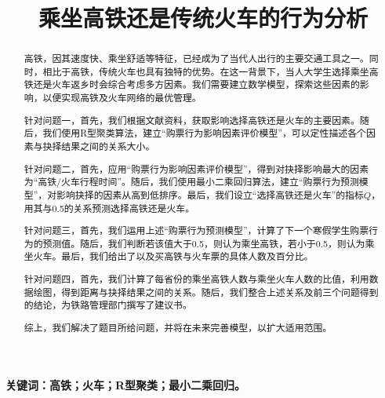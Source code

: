 \documentclass{ctexart}
\begin{document}

\title{\textbf{乘坐高铁还是传统火车的行为分析}}
\author{}
\date{}
\maketitle

\pagestyle{fancy}
\renewcommand{\headrulewidth}{0pt}
\lhead{\small{\leftmark}}
\chead{\small{\rightmark}}
\lfoot{}
\cfoot{}
\rfoot{}

\renewcommand{\abstractname}{\Large 摘要}
\begin{abstract}
	高铁，因其速度快、乘坐舒适等特征，已经成为了当代人出行的主要交通工具之一。同时，相比于高铁，传统火车也具有独特的优势。在这一背景下，当人大学生选择乘坐高铁还是火车返乡时会综合考虑多方因素。我们需要建立数学模型，探索这些因素的影响，以便实现高铁及火车网络的最优管理。

	针对问题一，首先，我们根据文献资料，获取影响选择高铁还是火车的主要因素。随后，我们使用R型聚类算法，建立\enquote{购票行为影响因素评价模型}，可以定性描述各个因素与抉择结果之间的关系大小。

	针对问题二，首先，应用\enquote{购票行为影响因素评价模型}，得到对抉择影响最大的因素为\enquote{高铁/火车行程时间}。随后，我们使用最小二乘回归算法，建立\enquote{购票行为预测模型}，对影响抉择的因素从高到低排序。最后，我们设立\enquote{选择高铁还是火车}的指标$Q$，用其与0.5的关系预测选择高铁还是火车。

	针对问题三，首先，我们运用上述\enquote{购票行为预测模型}，计算了下一个寒假学生购票行为的预测值。随后，我们判断若该值大于0.5，则认为乘坐高铁，若小于0.5，则认为乘坐火车。最后，我们给出了以及买高铁与火车票的具体人数及百分比。

	针对问题四，首先，我们计算了每省份的乘坐高铁人数与乘坐火车人数的比值，利用数据绘图，得到距离与抉择结果之间的关系。随后，我们整合上述关系及前三个问题得到的结论，为铁路管理部门撰写了建议书。

	综上，我们解决了题目所给问题，并将在未来完善模型，以扩大适用范围。

\end{abstract}

\textbf{关键词：高铁；火车；R型聚类；最小二乘回归。}

\newpage



\tableofcontents
\listoffigures
\listoftables
\listofexercises
\end{document}
